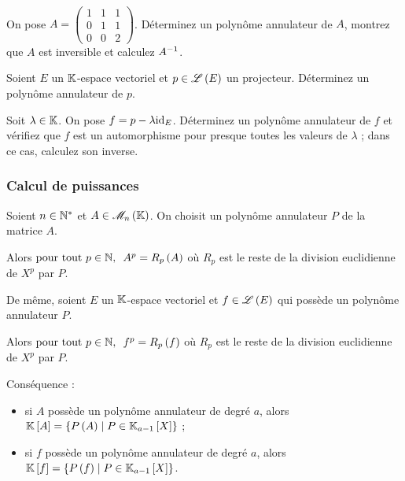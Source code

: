 \begin{exo}~\\
On pose \(A=\begin{pmatrix}
1 & 1 & 1 \\
0 & 1 & 1 \\
0 & 0 & 2
\end{pmatrix}\). Déterminez un polynôme annulateur de \(A\), montrez que \(A\) est inversible et calculez \(A^{-1}\).
\end{exo}

\begin{exo}
Soient \(E\) un \(\mathbb{K}\)-espace vectoriel et \(p\in\mathscr{L}\left(E\right)\) un projecteur. Déterminez un polynôme annulateur de \(p\).

Soit \(\lambda\in\mathbb{K}\). On pose \(f=p-\lambda\mathrm{id}_{E}\). Déterminez un polynôme annulateur de \(f\) et vérifiez que \(f\) est un automorphisme pour presque toutes les valeurs de \(\lambda\) ; dans ce cas, calculez son inverse.
\end{exo}

\subsubsection{Calcul de puissances}

\begin{prop}
Soient \(n\in\mathbb{N}^*\) et \(A\in\M{n}\). On choisit un polynôme annulateur \(P\) de la matrice \(A\).

Alors \(\quantifs{\tpt p\in\N}A^p=R_p\paren{A}\) où \(R_p\) est le reste de la division euclidienne de \(X^p\) par \(P\).

De même, soient \(E\) un \(\mathbb{K}\)-espace vectoriel et \(f\in\mathscr{L}\left(E\right)\) qui possède un polynôme annulateur \(P\).

Alors \(\quantifs{\tpt p\in\N}f^p=R_p\paren{f}\) où \(R_p\) est le reste de la division euclidienne de \(X^p\) par \(P\).
\end{prop}

Conséquence :

\begin{itemize}
    \item si \(A\) possède un polynôme annulateur de degré \(a\), alors \(\poly[\K][A]=\accol{P\paren{A}\tq P\in\polydeg{a-1}}\) ; \\
    \item si \(f\) possède un polynôme annulateur de degré \(a\), alors \(\poly[\K][f]=\accol{P\paren{f}\tq P\in\polydeg{a-1}}\).
\end{itemize}


